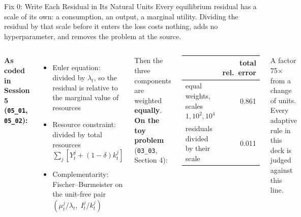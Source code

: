 \documentclass[aspectratio=169,11pt]{beamer}
\newcommand{\emphc}[1]{\textcolor{harvardcrimson}{#1}}
\begin{document}
\begin{frame}{Fix 0: Write Each Residual in Its Natural Units}
\small
Every equilibrium residual has a scale of its own: a consumption, an output, a marginal utility.
Dividing the residual by that scale \emphc{before} it enters the loss costs nothing, adds no
hyperparameter, and removes the problem at the source.

\vspace{0.15cm}
\begin{columns}[T]
\textbf{As coded in Session 5 (\texttt{05\_01}, \texttt{05\_02}):}
\begin{itemize}\itemsep2pt
  \item Euler equation: divided by $\lambda_t$, so the residual is relative to the marginal value of resources
  \item Resource constraint: divided by total resources $\sum_j [Y_t^j + (1-\delta)k_t^j]$
  \item Complementarity: Fischer--Burmeister on the unit-free pair $(\mu_t^j/\lambda_t,\; I_t^j/k_t^j)$
\end{itemize}
Then the three components are weighted \textbf{equally}.
\textbf{On the toy problem} (\texttt{03\_03}, Section 4):
\begin{center}
\renewcommand{\arraystretch}{1.15}
{\scriptsize
\begin{tabular}{@{}lr@{}}
\toprule
 & total rel.\ error \\
\midrule
equal weights, scales $1, 10^2, 10^4$ & 0.861 \\
residuals divided by their scale & 0.011 \\
\bottomrule
\end{tabular}}
\end{center}
{\scriptsize A factor 75$\times$ from a change of units. Every adaptive rule in this deck is judged against this line.}
\end{columns}
\end{frame}
\end{document}
